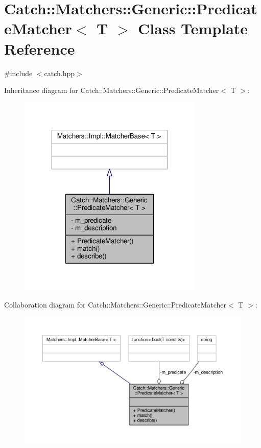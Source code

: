 \hypertarget{class_catch_1_1_matchers_1_1_generic_1_1_predicate_matcher}{\section{Catch\-:\-:Matchers\-:\-:Generic\-:\-:Predicate\-Matcher$<$ T $>$ Class Template Reference}
\label{class_catch_1_1_matchers_1_1_generic_1_1_predicate_matcher}
}


{\ttfamily \#include $<$catch.\-hpp$>$}



Inheritance diagram for Catch\-:\-:Matchers\-:\-:Generic\-:\-:Predicate\-Matcher$<$ T $>$\-:
\nopagebreak
\begin{figure}[H]
\begin{center}
\leavevmode
\includegraphics[width=250pt]{class_catch_1_1_matchers_1_1_generic_1_1_predicate_matcher__inherit__graph}
\end{center}
\end{figure}


Collaboration diagram for Catch\-:\-:Matchers\-:\-:Generic\-:\-:Predicate\-Matcher$<$ T $>$\-:
\nopagebreak
\begin{figure}[H]
\begin{center}
\leavevmode
\includegraphics[width=350pt]{class_catch_1_1_matchers_1_1_generic_1_1_predicate_matcher__coll__graph}
\end{center}
\end{figure}
